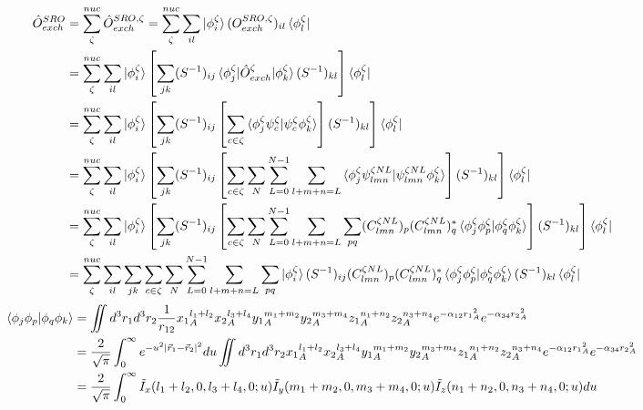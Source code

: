 \documentclass{article}
\begin{document}
	\begin{displaymath}
		\begin{aligned}
			\hat{O}^{SRO}_{exch} &=\sum_{\zeta}^{nuc}  \hat{O}^{SRO,\zeta}_{exch}
			=\sum_{\zeta}^{nuc} \sum_{il} \ket {\phi_i^{\zeta}} (O^{SRO,\zeta}_{exch})_{il} \bra{\phi^{\zeta}_l}\\
			&=\sum_{\zeta}^{nuc} \sum_{il} \ket{\phi_i^{\zeta}} \left[\sum_{jk}
			(S^{-1})_{ij} \braket{\phi^{\zeta}_j|\hat{O}^{\zeta}_{exch}|\phi^{\zeta}_k} (S^{-1})_{kl} \right]
			\bra{\phi^{\zeta}_l}\\
			&=\sum_{\zeta}^{nuc} \sum_{il} \ket{\phi_i^{\zeta}} \left[\sum_{jk} (S^{-1})_{ij}
			\left[ \sum_{c\in\zeta}\braket{\phi^{\zeta}_j \psi_c^{\zeta}|\psi_c^{\zeta} \phi^{\zeta}_k} \right]
			(S^{-1})_{kl}  \right] \bra{\phi^{\zeta}_l}\\
			&=\sum_{\zeta}^{nuc} \sum_{il} \ket{\phi_i^{\zeta}} \left[\sum_{jk} (S^{-1})_{ij}
			\left[ \sum_{c\in\zeta} \sum_N \sum_{L=0}^{N-1} \sum_{l+m+n=L}
			\braket{\phi^{\zeta}_j \psi_{lmn}^{\zeta NL}|\psi^{\zeta NL}_{lmn} \phi_k^{\zeta}} \right]
			(S^{-1})_{kl}  \right] \bra{\phi^{\zeta}_l}\\
			&=\sum_{\zeta}^{nuc} \sum_{il} \ket{\phi_i^{\zeta}} \left[\sum_{jk} (S^{-1})_{ij}
			\left[ \sum_{c\in\zeta} \sum_N \sum_{L=0}^{N-1} \sum_{l+m+n=L} \sum_{pq}
			(C^{\zeta NL}_{lmn})_p (C^{\zeta NL}_{lmn})^*_q
			\braket{\phi^{\zeta}_j \phi_{p}^{\zeta}|\phi_q^{\zeta} \phi^{\zeta}_{k}} 
			\right] (S^{-1})_{kl}  \right] \bra{\phi^{\zeta}_l}\\
			&=\sum_{\zeta}^{nuc} \sum_{il} \sum_{jk} \sum_{c\in\zeta} \sum_N \sum_{L=0}^{N-1} \sum_{l+m+n=L} \sum_{pq}
			\ket{\phi_i^{\zeta}} (S^{-1})_{ij} (C^{\zeta NL}_{lmn})_p (C^{\zeta NL}_{lmn})^*_q 
			\braket{\phi^{\zeta}_j \phi_{p}^{\zeta}|\phi_q^{\zeta} \phi^{\zeta}_{k}} (S^{-1})_{kl} \bra{\phi^{\zeta}_l}\\
		\end{aligned}
	\end{displaymath}
	\begin{displaymath}
		\begin{aligned}
			\braket{\phi_j\phi_p|\phi_q\phi_k}&=\iint d^3r_1 d^3r_2 \frac{1}{r_{12}}
			{x_1}^{l_1+l_2}_A {x_2}^{l_3+l_4}_A {y_1}_A^{m_1+m_2} {y_2}_A^{m_3+m_4} {z_1}_A^{n_1+n_2} 
			{z_2}_A^{n_3+n_4} e^{-\alpha_{12} {r_1}_A^2} e^{-\alpha_{34} {r_2}^2_A}\\
			&=\frac{2}{\sqrt{\pi}} \int_0^{\infty} e^{-u^2 \vert \vec{r}_1 - \vec{r}_2 \vert^2} du
			\iint d^3r_1 d^3r_2 {x_1}^{l_1+l_2}_A {x_2}^{l_3+l_4}_A {y_1}_A^{m_1+m_2} {y_2}_A^{m_3+m_4} {z_1}_A^{n_1+n_2} 
			{z_2}_A^{n_3+n_4} e^{-\alpha_{12} {r_1}_A^2} e^{-\alpha_{34} {r_2}^2_A} \\
			&=\frac{2}{\sqrt{\pi}} \int_0^{\infty} \tilde{I}_x(l_1+l_2,0,l_3+l_4,0;u)
			\tilde{I}_y(m_1+m_2,0,m_3+m_4,0;u) \tilde{I}_z(n_1+n_2,0,n_3+n_4,0;u) du \\
		\end{aligned}
	\end{displaymath}
\end{document}
